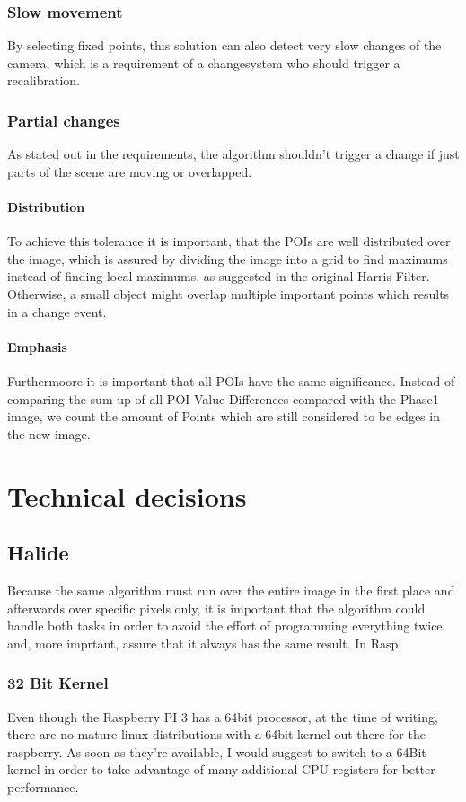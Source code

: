 \subsection{Slow movement}
By selecting fixed points, this solution can also detect very slow changes of the camera, which is a requirement of a changesystem who should trigger a recalibration.

\subsection{ Partial changes}
As stated out in the requirements, the algorithm shouldn't trigger a change if just parts of the scene are moving or overlapped. 
\subsubsection{Distribution}
To achieve this tolerance it is important, that the POIs are well distributed over the image, which is assured by dividing the image into a grid to find maximums instead of finding local maximums, as suggested in the original Harris-Filter. Otherwise, a small object might overlap multiple important points which results in a change event.
\subsubsection{ Emphasis }
Furthermoore it is important that all POIs have the same significance. Instead of comparing the sum up of all POI-Value-Differences compared with the Phase1 image, we count the amount of Points which are still considered to be edges in the new image.


\chapter{Technical decisions}
\section{Halide}
Because the same algorithm must run over the entire image in the first place and afterwards over specific pixels only, it is important that the  algorithm could handle both tasks in order to avoid the effort of programming everything twice and, more imprtant, assure that it always has the same result. In Rasp

\subsection{32 Bit Kernel}
Even though the Raspberry PI 3 has a 64bit processor, at the time of writing, there are no mature linux distributions with a 64bit kernel out there for the raspberry. As soon as they're available, I would suggest to switch to a 64Bit kernel in order to take advantage of many additional CPU-registers for better performance.

